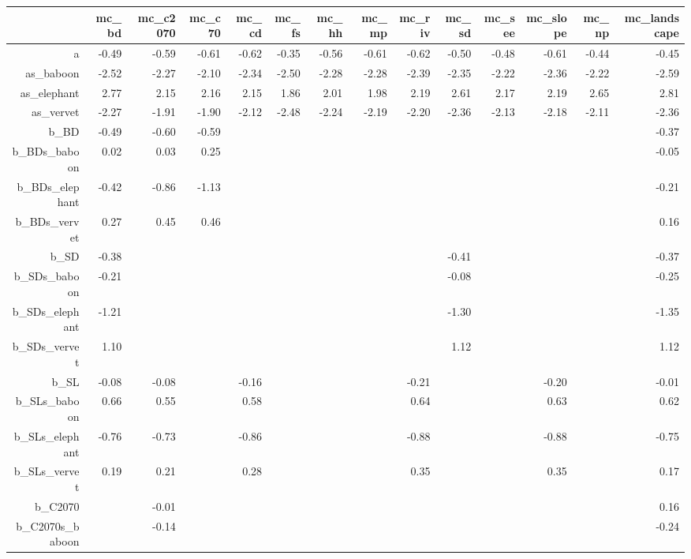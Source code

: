 \begin{table}[ht]
\centering
\begin{tabular}{rrrrrrrrrrrrrr}
  \hline
 & mc\_bd & mc\_c2070 & mc\_c70 & mc\_cd & mc\_fs & mc\_hh & mc\_mp & mc\_riv & mc\_sd & mc\_see & mc\_slope & mc\_np & mc\_landscape \\ 
  \hline
a & -0.49 & -0.59 & -0.61 & -0.62 & -0.35 & -0.56 & -0.61 & -0.62 & -0.50 & -0.48 & -0.61 & -0.44 & -0.45 \\ 
  as\_baboon & -2.52 & -2.27 & -2.10 & -2.34 & -2.50 & -2.28 & -2.28 & -2.39 & -2.35 & -2.22 & -2.36 & -2.22 & -2.59 \\ 
  as\_elephant & 2.77 & 2.15 & 2.16 & 2.15 & 1.86 & 2.01 & 1.98 & 2.19 & 2.61 & 2.17 & 2.19 & 2.65 & 2.81 \\ 
  as\_vervet & -2.27 & -1.91 & -1.90 & -2.12 & -2.48 & -2.24 & -2.19 & -2.20 & -2.36 & -2.13 & -2.18 & -2.11 & -2.36 \\ 
  b\_BD & -0.49 & -0.60 & -0.59 &  &  &  &  &  &  &  &  &  & -0.37 \\ 
  b\_BDs\_baboon & 0.02 & 0.03 & 0.25 &  &  &  &  &  &  &  &  &  & -0.05 \\ 
  b\_BDs\_elephant & -0.42 & -0.86 & -1.13 &  &  &  &  &  &  &  &  &  & -0.21 \\ 
  b\_BDs\_vervet & 0.27 & 0.45 & 0.46 &  &  &  &  &  &  &  &  &  & 0.16 \\ 
  b\_SD & -0.38 &  &  &  &  &  &  &  & -0.41 &  &  &  & -0.37 \\ 
  b\_SDs\_baboon & -0.21 &  &  &  &  &  &  &  & -0.08 &  &  &  & -0.25 \\ 
  b\_SDs\_elephant & -1.21 &  &  &  &  &  &  &  & -1.30 &  &  &  & -1.35 \\ 
  b\_SDs\_vervet & 1.10 &  &  &  &  &  &  &  & 1.12 &  &  &  & 1.12 \\ 
  b\_SL & -0.08 & -0.08 &  & -0.16 &  &  &  & -0.21 &  &  & -0.20 &  & -0.01 \\ 
  b\_SLs\_baboon & 0.66 & 0.55 &  & 0.58 &  &  &  & 0.64 &  &  & 0.63 &  & 0.62 \\ 
  b\_SLs\_elephant & -0.76 & -0.73 &  & -0.86 &  &  &  & -0.88 &  &  & -0.88 &  & -0.75 \\ 
  b\_SLs\_vervet & 0.19 & 0.21 &  & 0.28 &  &  &  & 0.35 &  &  & 0.35 &  & 0.17 \\ 
  b\_C2070 &  & -0.01 &  &  &  &  &  &  &  &  &  &  & 0.16 \\ 
  b\_C2070s\_baboon &  & -0.14 &  &  &  &  &  &  &  &  &  &  & -0.24 \\ 

\end{tabular}
\end{table}
